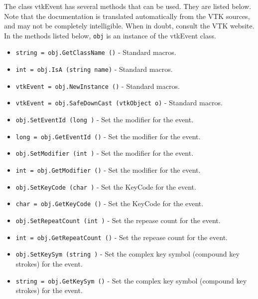 The class vtkEvent has several methods that can be used.
  They are listed below.
Note that the documentation is translated automatically from the VTK sources,
and may not be completely intelligible.  When in doubt, consult the VTK website.
In the methods listed below, \verb|obj| is an instance of the vtkEvent class.
\begin{itemize}
\item  \verb|string = obj.GetClassName ()| -  Standard macros.

\item  \verb|int = obj.IsA (string name)| -  Standard macros.

\item  \verb|vtkEvent = obj.NewInstance ()| -  Standard macros.

\item  \verb|vtkEvent = obj.SafeDownCast (vtkObject o)| -  Standard macros.

\item  \verb|obj.SetEventId (long )| -  Set the modifier for the event.

\item  \verb|long = obj.GetEventId ()| -  Set the modifier for the event.

\item  \verb|obj.SetModifier (int )| -  Set the modifier for the event.

\item  \verb|int = obj.GetModifier ()| -  Set the modifier for the event.

\item  \verb|obj.SetKeyCode (char )| -  Set the KeyCode for the event.

\item  \verb|char = obj.GetKeyCode ()| -  Set the KeyCode for the event.

\item  \verb|obj.SetRepeatCount (int )| -  Set the repease count for the event.

\item  \verb|int = obj.GetRepeatCount ()| -  Set the repease count for the event.

\item  \verb|obj.SetKeySym (string )| -  Set the complex key symbol (compound key strokes) for the event.

\item  \verb|string = obj.GetKeySym ()| -  Set the complex key symbol (compound key strokes) for the event.

\end{itemize}
